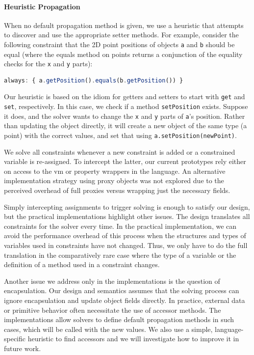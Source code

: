 \paragraph*{Heuristic Propagation}
When no default propagation method is given, we use a heuristic that attempts to
discover and use the appropriate setter methods. For example, consider the
following constraint that the 2D point positions of objects \lstinline!a!  and
\lstinline!b! should be equal (where the equals method on points returns a
conjunction of the equality checks for the \lstinline!x!  and \lstinline!y!
parts):
\begin{lstlisting}[language=JavaScript]
always: { a.getPosition().equals(b.getPosition()) }
\end{lstlisting}
Our heuristic is based on the idiom for getters and setters to start with
\lstinline!get! and \lstinline!set!, respectively. In this case, we check if a
method \lstinline!setPosition! exists. Suppose it does, and the solver wants to
change the \lstinline!x! and \lstinline!y! parts of \lstinline!a!'s position.
Rather than updating the object directly, it will create a new object of the
same type (a point) with the correct values, and set that using
\lstinline!a.setPosition(newPoint)!.

\SummarySep

We solve all constraints whenever a new constraint is added or a constrained
variable is re-assigned. To intercept the latter, our current prototypes rely
either on access to the \ac{vm} or property wrappers in the language. An
alternative implementation strategy using proxy objects was not explored due to
the perceived overhead of full proxies versus wrapping just the necessary
fields.

Simply intercepting assignments to trigger solving is enough to satisfy our
design, but the practical implementations highlight other issues. The design
translates all constraints for the solver every time. In the practical
implementation, we can avoid the performance overhead of this process when the
structures and types of variables used in constraints have not changed. Thus, we
only have to do the full translation in the comparatively rare case where the
type of a variable or the definition of a method used in a constraint changes.

Another issue we address only in the implementations is the question of
encapsulation. Our design and semantics assumes that the solving process can
ignore encapsulation and update object fields directly. In practice, external
data or primitive behavior often necessitate the use of accessor methods. The
implementations allow solvers to define default propagation methods in such
cases, which will be called with the new values. We also use a simple,
language-specific heuristic to find accessors and we will investigate how to
improve it in future work.


